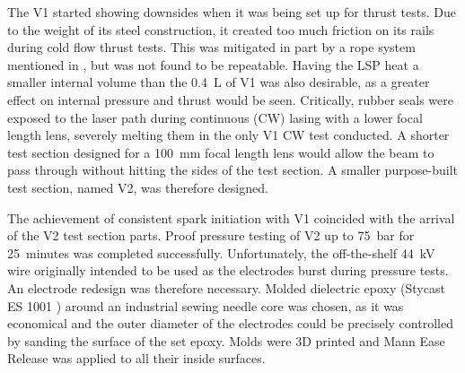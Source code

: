 The V1 started showing downsides when it was being set up for thrust tests. Due to the weight of its steel construction, it created too much friction on its rails during cold flow thrust tests. This was mitigated in part by a rope system mentioned in \textcite{duplayArgonLaserPlasmaThruster2024a}, but was not found to be repeatable. Having the LSP heat a smaller internal volume than the \qty{0.4}{L} of V1 was also desirable, as a greater effect on internal pressure and thrust would be seen. Critically, rubber seals were exposed to the laser path during continuous (CW) lasing with a lower focal length lens, severely melting them in the only V1 CW test conducted. A shorter test section designed for a \qty{100}{mm} focal length lens would allow the beam to pass through without hitting the sides of the test section. A smaller purpose-built test section, named V2, was therefore designed.

The achievement of consistent spark initiation with V1 coincided with the arrival of the V2 test section parts. Proof pressure testing of V2 up to \qty{75}{bar} for \qty{25}{minutes} was completed successfully. Unfortunately, the off-the-shelf \qty{44}{kV} wire originally intended to be used as the electrodes burst during pressure tests. An electrode redesign was therefore necessary. Molded dielectric epoxy (Stycast ES 1001 \textcite{McMasterCarr}) around an industrial sewing needle core was chosen, as it was economical and the outer diameter of the electrodes could be precisely controlled by sanding the surface of the set epoxy. Molds were 3D printed and Mann Ease Release was applied to all their inside surfaces.

